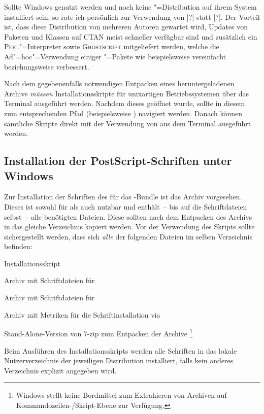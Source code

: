 Sollte Windows genutzt werden und noch keine "=Distribution auf 
ihrem System installiert sein, so rate ich persönlich zur Verwendung von 
|?| statt |?|. 
Der Vorteil ist, dass diese Distribution von mehreren Autoren gewartet wird, 
Updates von Paketen und Klassen auf CTAN meist schneller verfügbar sind und 
zusätzlich ein \textsc{Perl}"=Interpreter sowie \textsc{Ghostscript} 
mitgeliefert werden, welche die Ad"=hoc"=Verwendung einiger 
"=Pakete wie beispielsweise  vereinfacht 
beziehungsweise verbessert.

Nach dem gegebenenfalls notwendigen Entpacken eines heruntergeladenen Archivs
\emph{müssen} Installationsskripte für unixartigen Betriebssystemen über das 
Terminal ausgeführt werden. Nachdem dieses geöffnet wurde, sollte in diesem zum 
entsprechenden Pfad (beispielsweise ) 
navigiert werden. Danach können sämtliche Skripte direkt mit der Verwendung von
 aus dem Terminal ausgeführt werden.


\subsection{Installation der PostScript-Schriften unter Windows}
\label{sec:install:fonts:win}
Zur Installation der Schriften des \CDs für das \TUDScript-Bundle ist das Archiv
%
{} vorgesehen. Dieses ist sowohl für 
 als auch  
nutzbar und enthält~-- bis auf die Schriftdateien selbst~-- alle benötigten 
Dateien. Diese sollten nach dem Entpacken des Archivs in das gleiche 
Verzeichnis kopiert werden. Vor der Verwendung des Skripts 
 sollte sichergestellt werden, dass sich 
\emph{alle} der folgenden Dateien im selben Verzeichnis befinden:
%
\settowidth{}%
\begin{description}[labelwidth=\tempdim,labelsep=1em]
  \item[\File{tudscrfonts\_install.bat}]Installationsskript
  \item[\File{Univers\_PS.zip}]Archiv mit Schriftdateien für \Univers
  \item[\File{DIN\_Bd\_PS.zip}]Archiv mit Schriftdateien für \DIN
  \item[\File{tudscrfonts.zip}]Archiv mit Metriken für die
    Schriftinstallation via 
  \item[\File{7za.exe}]Stand-Alone-Version von 7-zip zum Entpacken der Archive%
    \footnote{%
      Windows stellt keine Bordmittel zum Extrahieren von Archiven auf 
      Kommandozeilen-/Skript-Ebene zur Verfügung.%
    }%
\end{description}
%
Beim Ausführen des Installationsskripts werden alle Schriften in das lokale 
Nutzerverzeichnis der jeweiligen Distribution installiert, falls kein anderes 
Verzeichnis explizit angegeben wird.

